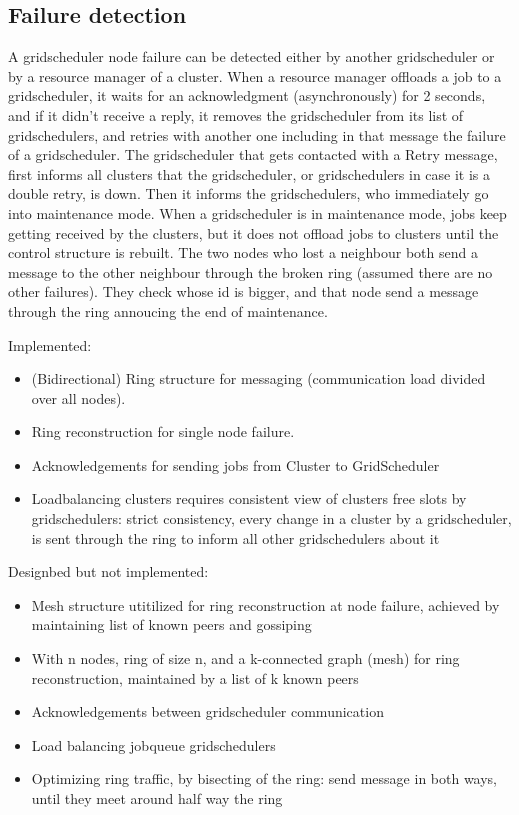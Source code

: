 \documentclass[twocolumn,a4paper]{article}
\begin{document}
\subsection{Failure detection}
A gridscheduler node failure can be detected either by another gridscheduler or by a resource manager of a cluster.
When a resource manager offloads a job to a gridscheduler, it waits for an acknowledgment (asynchronously) for 2 seconds, and if it didn't receive a reply, it removes the gridscheduler from its list of gridschedulers, and retries with another one including in that message the failure of a gridscheduler. The gridscheduler that gets contacted with a Retry message, first informs all clusters that the gridscheduler, or gridschedulers in case it is a double retry, is down. Then it informs the gridschedulers, who immediately go into maintenance mode. When a gridscheduler is in maintenance mode, jobs keep getting received by the clusters, but it does not offload jobs to clusters until the control structure is rebuilt. The two nodes who lost a neighbour both send a message to the other neighbour through the broken ring (assumed there are no other failures). They check whose id is bigger, and that node send a message through the ring annoucing the end of maintenance.

Implemented:
\begin{itemize}
	\item (Bidirectional) Ring structure for messaging (communication load divided over all nodes).
	\item Ring reconstruction for single node failure.
	\item Acknowledgements for sending jobs from Cluster to GridScheduler
	\item Loadbalancing clusters requires consistent view of clusters free slots by gridschedulers: strict consistency, every change in a cluster by a gridscheduler, is sent through the ring to inform all other gridschedulers about it
\end{itemize}

Designbed but not implemented:
\begin{itemize}
	\item Mesh structure utitilized for ring reconstruction at node failure, achieved by maintaining list of known peers and gossiping
	\item With n nodes, ring of size n, and a k-connected graph (mesh) for ring reconstruction, maintained by a list of k known peers
	\item Acknowledgements between gridscheduler communication
	\item Load balancing jobqueue gridschedulers
	\item Optimizing ring traffic, by bisecting of the ring: send message in both ways, until they meet around half way the ring
\end{itemize}
\end{document}
